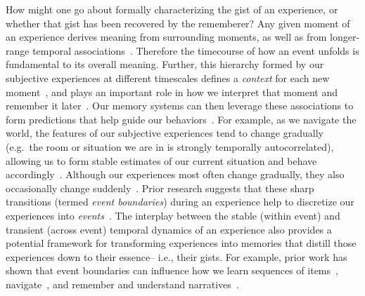 \documentclass{article}
\begin{document}
How might one go about formally characterizing the gist of an experience, or whether that gist has been recovered by the rememberer?  Any given moment of an experience derives meaning from surrounding moments, as well as from longer-range temporal associations~\citep[e.g., ][]{LernEtal11}.  Therefore the timecourse of how an event unfolds is fundamental to its overall meaning.  Further, this hierarchy formed by our subjective experiences at different timescales defines a \textit{context} for each new moment~\citep[e.g., ][]{HowaKaha02, HowaEtal14}, and plays an important role in how we interpret that moment and remember it later~\citep[for review see][]{MannEtal15}.  Our memory systems can then leverage these associations to form predictions that help guide our behaviors~\citep{RangRitc12}.  For example, as we navigate the world, the features of our subjective experiences tend to change gradually (e.g.\ the room or situation we are in is strongly temporally autocorrelated), allowing us to form stable estimates of our current situation and behave accordingly~\citep{ZackEtal07, ZwaaRadv98}.  Although our experiences most often change gradually, they also occasionally change suddenly~\citep[e.g., when we walk through a doorway; ][]{RadvZack17}.  Prior research suggests that these sharp transitions (termed \textit{event boundaries}) during an experience help to discretize our experiences into \textit{events}~\citep{RadvZack17, BrunEtal18, HeusEtal18, ClewDava17, EzzyDava11, DuBrDava13}.  The interplay between the stable (within event) and transient (across event) temporal dynamics of an experience also provides a potential framework for transforming experiences into memories that distill those experiences down to their essence-- i.e., their gists.  For example, prior work has shown that event boundaries can influence how we learn sequences of items~\citep{HeusEtal18, DuBrDava13}, navigate~\citep{BrunEtal18}, and remember and understand narratives~\citep{ZwaaRadv98, EzzyDava11}.
\end{document}
